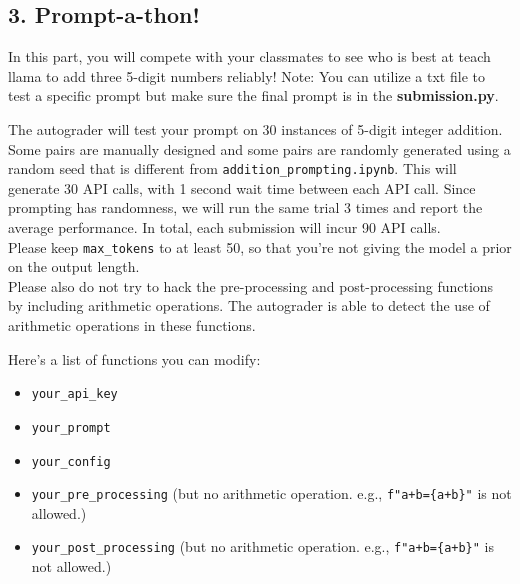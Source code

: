 \documentclass{article}
\theoremstyle{case}
\theoremstyle{definition}
\begin{document}
\newpage
\subsection*{3. Prompt-a-thon!}

In this part, you will compete with your classmates to see who is best at teach llama to add three 5-digit numbers reliably! Note: You can utilize a txt file to test a specific prompt but make sure the final prompt is in the \textbf{submission.py}. 

The autograder will test your prompt on 30 instances of 5-digit integer addition. Some pairs are manually designed and some pairs are randomly generated using a random seed that is different from \texttt{addition\_prompting.ipynb}. This will generate 30 API calls, with 1 second wait time between each API call. Since prompting has randomness, we will run the same trial 3 times and report the average performance. In total, each submission will incur 90 API calls. \\

Please keep \texttt{max\_tokens} to at least 50, so that you're not giving the model a prior on the output length. \\ Please also do not try to hack the pre-processing and post-processing functions by including arithmetic operations. The autograder is able to detect the use of arithmetic operations in these functions.

Here's a list of functions you can modify:
\begin{itemize}
    \item \texttt{your\_api\_key}
    \item \texttt{your\_prompt}
    \item \texttt{your\_config}
    \item \texttt{your\_pre\_processing} (but no arithmetic operation. e.g., \texttt{f"a+b=\{a+b\}"} is not allowed.)
    \item \texttt{your\_post\_processing} (but no arithmetic operation. e.g., \texttt{f"a+b=\{a+b\}"} is not allowed.)
\end{itemize}
\end{document}

